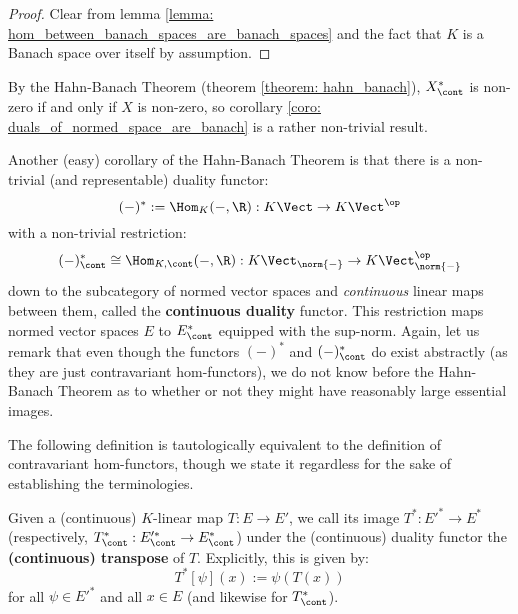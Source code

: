             \begin{proof}
                Clear from lemma \ref{lemma: hom_between_banach_spaces_are_banach_spaces} and the fact that $K$ is a Banach space over itself by assumption.
            \end{proof}
        \begin{remark}
            By the Hahn-Banach Theorem (theorem \ref{theorem: hahn_banach}), $X^*_{\cont}$ is non-zero if and only if $X$ is non-zero, so corollary \ref{coro: duals_of_normed_space_are_banach} is a rather non-trivial result.
        \end{remark}

        Another (easy) corollary of the Hahn-Banach Theorem is that there is a non-trivial (and representable) duality functor:
            $$(-)^* := \Hom_K(-, \R): K\-\Vect \to K\-\Vect^{\op}$$
        with a non-trivial restriction:
            $$(-)^*_{\cont} \cong \Hom_{K, \cont}(-, \R): K\-\Vect_{\norm{-}} \to K\-\Vect_{\norm{-}}^{\op}$$
        down to the subcategory of normed vector spaces and \textit{continuous} linear maps between them, called the \textbf{continuous duality} functor. This restriction maps normed vector spaces $E$ to $E^*_{\cont}$ equipped with the sup-norm. Again, let us remark that even though the functors $(-)^*$ and $(-)^*_{\cont}$ do exist abstractly (as they are just contravariant hom-functors), we do not know before the Hahn-Banach Theorem as to whether or not they might have reasonably large essential images.
        
        The following definition is tautologically equivalent to the definition of contravariant hom-functors, though we state it regardless for the sake of establishing the terminologies. 
        \begin{definition}[Transposition] \label{def: transposition}
            Given a (continuous) $K$-linear map $T: E \to E'$, we call its image $T^*: E'^* \to E^*$ (respectively, $T^*_{\cont}: E'^*_{\cont} \to E^*_{\cont}$) under the (continuous) duality functor the \textbf{(continuous) transpose} of $T$. Explicitly, this is given by:
                $$T^*[\psi](x) := \psi( T(x) )$$
            for all $\psi \in E'^*$ and all $x \in E$ (and likewise for $T^*_{\cont}$).
        \end{definition}

